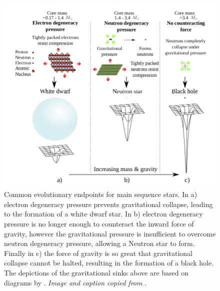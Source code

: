 \begin{figure}[!ht]
\centering
\includegraphics[scale=0.4]{figures/screenshot-1}
\caption[Evolutionary endpoints for main sequence stars]{Common evolutionary endpoints for main sequence stars. In a) electron degeneracy pressure prevents gravitational collapse, leading to the formation of a white dwarf star. In b) electron degeneracy pressure is no longer enough to counteract the inward force of gravity, however the gravitational pressure is insufficient to overcome neutron degeneracy pressure, allowing a Neutron star to form. Finally in c) the force of gravity is so great that gravitational collapse cannot be halted, resulting in the formation of a black hole. The depictions of the gravitational sinks above are based on diagrams by \citep{star-eater}. \textit{Image and caption copied from} \citep{lyon}.}	
\label{fig:evol-endpoints}
\end{figure}

